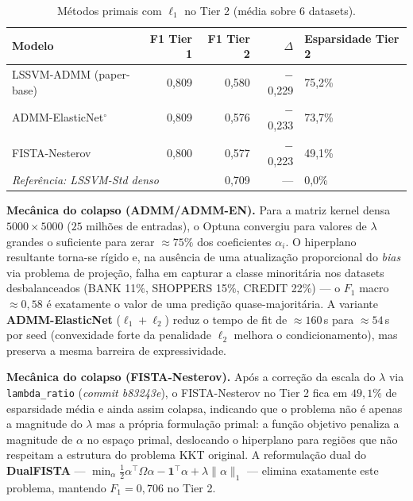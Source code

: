 \documentclass[12pt,a4paper]{article}
\begin{document}
\begin{table}[H]
\centering
\caption{Métodos primais com $\ell_1$ no Tier 2 (média sobre 6 datasets).}
\label{tab:primal_collapse}
\begin{tabular}{lrrrl}
\toprule
\textbf{Modelo} & \textbf{F1 Tier 1} & \textbf{F1 Tier 2} & \textbf{$\Delta$} & \textbf{Esparsidade Tier 2} \\
\midrule
LSSVM-ADMM (paper-base)  & 0,809 & 0,580 & $-$0,229 & 75,2\% \\
ADMM-ElasticNet$^\circ$ & 0,809 & 0,576 & $-$0,233 & 73,7\% \\
FISTA-Nesterov           & 0,800 & 0,577 & $-$0,223 & 49,1\% \\
\midrule
\multicolumn{2}{l}{\textit{Referência: LSSVM-Std denso}} & 0,709 & ---       & 0,0\% \\
\bottomrule
\end{tabular}
\end{table}

\textbf{Mecânica do colapso (ADMM/ADMM-EN).} Para a matriz kernel densa
$5000 \times 5000$ ($25$ milhões de entradas), o Optuna convergiu para
valores de $\lambda$ grandes o suficiente para zerar $\approx 75\%$ dos
coeficientes $\alpha_i$. O hiperplano resultante torna-se rígido e, na
ausência de uma atualização proporcional do \emph{bias} via problema de
projeção, falha em capturar a classe minoritária nos datasets desbalanceados
(BANK 11\%, SHOPPERS 15\%, CREDIT 22\%) --- o $F_1$ macro $\approx 0{,}58$ é
exatamente o valor de uma predição quase-majoritária. A variante
\textbf{ADMM-ElasticNet} ($\ell_1 + \ell_2$) reduz o tempo de fit de
$\approx 160$\,s para $\approx 54$\,s por seed (convexidade forte da
penalidade $\ell_2$ melhora o condicionamento), mas preserva a mesma
barreira de expressividade.

\textbf{Mecânica do colapso (FISTA-Nesterov).} Após a correção da escala
do $\lambda$ via \texttt{lambda\_ratio} (\emph{commit b83243e}), o
FISTA-Nesterov no Tier 2 fica em $49{,}1\%$ de esparsidade média e ainda
assim colapsa, indicando que o problema não é apenas a magnitude do
$\lambda$ mas a própria formulação primal: a função objetivo penaliza a
magnitude de $\alpha$ no espaço primal, deslocando o hiperplano para
regiões que não respeitam a estrutura do problema KKT original. A
reformulação dual do \textbf{DualFISTA} ---
$\min_\alpha \tfrac{1}{2}\alpha^\top\Omega\alpha - \mathbf{1}^\top\alpha + \lambda\|\alpha\|_1$ ---
elimina exatamente este problema, mantendo $F_1 = 0{,}706$ no Tier 2.
\end{document}
